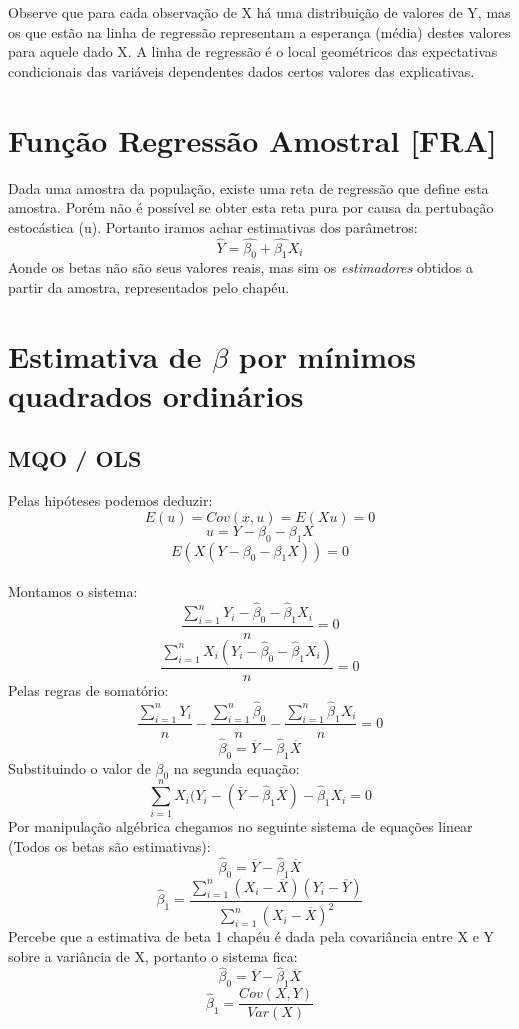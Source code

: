 \documentclass[12pt,a4paper,oneside,brazil]{abntex2}
\begin{document}
Observe que para cada observação de X há uma distribuição de valores de Y, mas os que estão na linha de regressão representam a esperança (média) destes valores para aquele dado X. A linha de regressão é o local geométricos das expectativas condicionais das variáveis dependentes dados certos valores das explicativas.
\clearpage
\section{Função Regressão Amostral [FRA]}
Dada uma amostra da população, existe uma reta de regressão que define esta amostra. Porém não é possível se obter esta reta pura por causa da pertubação estocástica (u). Portanto iramos achar estimativas dos parâmetros:
\[ \hat{Y} = \hat{\beta_0} + \hat{\beta_1} X_i \]
Aonde os betas não são seus valores reais, mas sim os \emph{estimadores} obtidos a partir da amostra, representados pelo chapéu.

\section{Estimativa de $\beta$ por mínimos quadrados ordinários}

\subsection{MQO / OLS}
Pelas hipóteses podemos deduzir:
\[ E(u) = Cov(x,u) = E(X u) = 0 \]
\[ u = Y - \beta_0 - \beta_1 X\]
\[E(X (Y - \beta_0 - \beta_1 X)) = 0 \]\\
Montamos o sistema:
\begin{equation} \label{beta0}
 \frac{\sum_{i=1}^{n} Y_i - \hat{\beta}_0 - \hat\beta_1 X_i}{n} = 0 
 \end{equation}
 \begin{equation} \label{beta1}
\frac{\sum_{i=1}^{n} X_i (Y_i - \hat{\beta}_0 - \hat{\beta}_1 X_i)}{n} = 0
 \end{equation}
Pelas regras de somatório:
\[ \frac{\sum_{i=1}^{n} Y_i}{n} -\frac{\sum_{i=1}^{n} \hat{\beta}_0}{n} - \frac{\sum_{i=1}^{n} \hat{\beta}_1 X_i}{n} = 0 \]
\[  \hat{\beta}_0 = \overline{Y} - \hat{\beta}_1 \overline{X} \]
Substituindo o valor de $\beta_0$ na segunda equação:
\[\sum_{i=1}^{n} X_i (Y_i - ( \overline{Y} - \hat{\beta}_1 \overline{X}) - \hat{\beta}_1 X_i = 0 \]
Por manipulação algébrica chegamos no seguinte sistema de equações linear (Todos os betas são estimativas):
\[ \hat{\beta}_0 = \overline{Y} - \hat{\beta}_1 \overline{X} \]
\[\hat{\beta}_1 = \frac{ \sum_{i=1}^{n} ( X_i - \overline{X}) ( Y_i - \overline{Y})}{{\sum_{i=1}^{n} ( X_i - \overline{X})^2}} \]
Percebe que a estimativa de beta 1 chapéu é dada pela covariância entre X e Y sobre a variância de X, portanto o sistema fica:
\begin{equation}\label{beta0chapeu}
 \hat{\beta}_0 = \overline{Y} - \hat{\beta}_1 \overline{X} 
\end{equation}
\begin{equation} \label{beta1chapeu}
\hat{\beta}_1 = \frac{Cov(X,Y)}{Var(X)} 
\end{equation}
\end{document}
